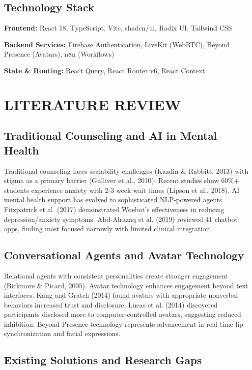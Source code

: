 \documentclass[11pt,a4paper]{report}
\begin{document}
\section{Technology Stack}

\textbf{Frontend:} React 18, TypeScript, Vite, shadcn/ui, Radix UI, Tailwind CSS

\textbf{Backend Services:} Firebase Authentication, LiveKit (WebRTC), Beyond Presence (Avatars), n8n (Workflows)

\textbf{State \& Routing:} React Query, React Router v6, React Context

\chapter{LITERATURE REVIEW}

\section{Traditional Counseling and AI in Mental Health}
Traditional counseling faces scalability challenges (Kazdin \& Rabbitt, 2013) with stigma as a primary barrier (Gulliver et al., 2010). Recent studies show 60\%+ students experience anxiety with 2-3 week wait times (Lipson et al., 2018). AI mental health support has evolved to sophisticated NLP-powered agents. Fitzpatrick et al. (2017) demonstrated Woebot's effectiveness in reducing depression/anxiety symptoms. Abd-Alrazaq et al. (2019) reviewed 41 chatbot apps, finding most focused narrowly with limited clinical integration.

\section{Conversational Agents and Avatar Technology}
Relational agents with consistent personalities create stronger engagement (Bickmore \& Picard, 2005). Avatar technology enhances engagement beyond text interfaces. Kang and Gratch (2014) found avatars with appropriate nonverbal behaviors increased trust and disclosure. Lucas et al. (2014) discovered participants disclosed more to computer-controlled avatars, suggesting reduced inhibition. Beyond Presence technology represents advancement in real-time lip synchronization and facial expressions.

\section{Existing Solutions and Research Gaps}
\end{document}
